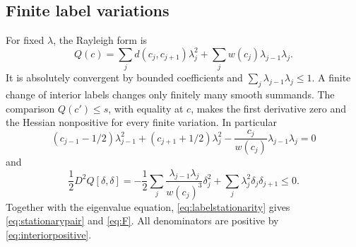 \subsection{Finite label variations}
For fixed \(\lambda\), the Rayleigh form is
\[
 Q(c)=\sum_j d(c_j,c_{j+1})\lambda_j^2+
             \sum_j w(c_j)\lambda_{j-1}\lambda_j.
\]
It is absolutely convergent by bounded coefficients and
\(\sum_j\lambda_{j-1}\lambda_j\le1\). A finite change of interior
labels changes only finitely many smooth summands. The comparison
\(Q(c')\le s\), with equality at \(c\), makes the first derivative zero
and the Hessian nonpositive for every finite variation. In particular
\begin{equation}\label{eq:labelstationarity}
 (c_{j-1}-1/2)\lambda_{j-1}^2+
 (c_{j+1}+1/2)\lambda_j^2
 -\frac{c_j}{w(c_j)}\lambda_{j-1}\lambda_j=0
\end{equation}
and
\begin{equation}\label{eq:Hessian}
 \frac12D^2Q[\delta,\delta]
 =-\frac12\sum_j\frac{\lambda_{j-1}\lambda_j}{w(c_j)^3}\delta_j^2
          +\sum_j\lambda_j^2\delta_j\delta_{j+1}\le0.
\end{equation}
Together with the eigenvalue equation, \eqref{eq:labelstationarity}
gives \eqref{eq:stationarypair} and \eqref{eq:F}. All denominators
are positive by \eqref{eq:interiorpositive}.


